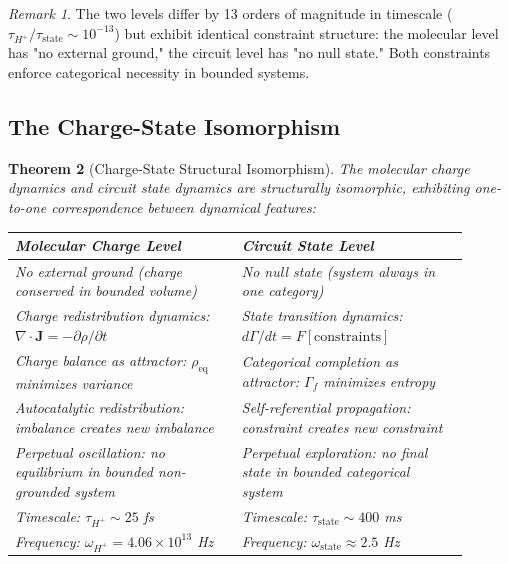 \documentclass[aps,prd,twocolumn,superscriptaddress,floatfix,nofootinbib]{revtex4-2}
\newtheorem{theorem}{Theorem}[section]
\theoremstyle{remark}
\newtheorem{remark}[theorem]{Remark}
\begin{document}
\begin{remark}
The two levels differ by 13 orders of magnitude in timescale ($\tau_{H^+} / \tau_{\text{state}} \sim 10^{-13}$) but exhibit identical constraint structure: the molecular level has "no external ground," the circuit level has "no null state." Both constraints enforce categorical necessity in bounded systems.
\end{remark}

\subsection{The Charge-State Isomorphism}

\begin{theorem}[Charge-State Structural Isomorphism]
\label{thm:charge_state_isomorphism}
The molecular charge dynamics and circuit state dynamics are structurally isomorphic, exhibiting one-to-one correspondence between dynamical features:

\begin{center}
\begin{tabular}{@{}p{0.45\linewidth}p{0.45\linewidth}@{}}
\toprule
\textbf{Molecular Charge Level} & \textbf{Circuit State Level} \\
\midrule
No external ground (charge conserved in bounded volume) & No null state (system always in one category) \\[0.5em]
Charge redistribution dynamics: $\nabla \cdot \mathbf{J} = -\partial\rho/\partial t$ & State transition dynamics: $d\Gamma/dt = F[\text{constraints}]$ \\[0.5em]
Charge balance as attractor: $\rho_{\text{eq}}$ minimizes variance & Categorical completion as attractor: $\Gamma_f$ minimizes entropy \\[0.5em]
Autocatalytic redistribution: imbalance creates new imbalance & Self-referential propagation: constraint creates new constraint \\[0.5em]
Perpetual oscillation: no equilibrium in bounded non-grounded system & Perpetual exploration: no final state in bounded categorical system \\[0.5em]
Timescale: $\tau_{H^+} \sim 25$ fs & Timescale: $\tau_{\text{state}} \sim 400$ ms \\[0.5em]
Frequency: $\omega_{H^+} = 4.06 \times 10^{13}$ Hz & Frequency: $\omega_{\text{state}} \approx 2.5$ Hz \\
\bottomrule
\end{tabular}
\end{center}
\end{theorem}
\end{document}
